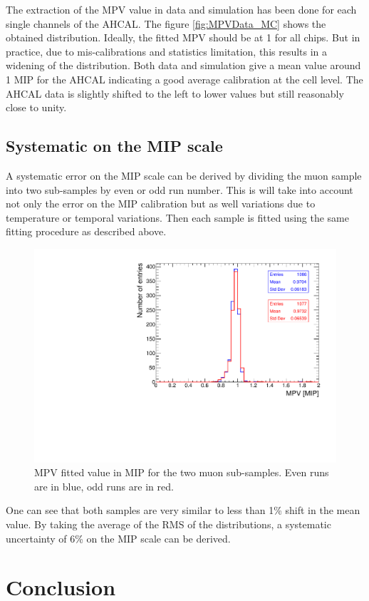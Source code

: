 The extraction of the MPV value in data and simulation has been done for each single channels of the AHCAL. The figure \ref{fig:MPVData_MC} shows the obtained distribution. Ideally, the fitted MPV should be at 1 for all chips. But in practice, due to mis-calibrations and statistics limitation, this results in a widening of the distribution. Both data and simulation give a mean value around 1 MIP for the AHCAL indicating a good average calibration at the cell level. The AHCAL data is slightly shifted to the left to lower values but still reasonably close to unity.

\subsection{Systematic on the MIP scale}

A systematic error on the MIP scale can be derived by dividing the muon sample into two sub-samples by even or odd run number. This is will take into account not only the error on the MIP calibration but as well variations due to temperature or temporal variations. Then each sample is fitted using the same fitting procedure as described above.

\begin{figure}[htbp!]
	\centering
	\includegraphics[width=0.7\linewidth]{../Thesis_Plots/EnergyCalib/Plots/SystematicMIP.pdf}
	\caption{MPV fitted value in MIP for the two muon sub-samples. Even runs are in blue, odd runs are in red.} \label{fig:MIPSyst}
\end{figure}

One can see that both samples are very similar to less than 1\% shift in the mean value. By taking the average of the RMS of the distributions, a systematic uncertainty of 6\% on the MIP scale can be derived.

\section{Conclusion}

